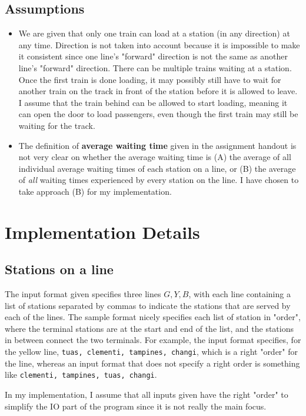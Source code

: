 \documentclass[12pt]{article}
\begin{document}
\subsection{Assumptions}
\begin{itemize}
	\item We are given that only one train can load at a station (in any direction) at any time. Direction is not taken into account because it is impossible to make it consistent since one line's "forward" direction is not the same as another line's "forward" direction. There can be multiple trains waiting at a station. Once the first train is done loading, it may possibly still have to wait for another train on the track in front of the station before it is allowed to leave. I assume that the train behind can be allowed to start loading, meaning it can open the door to load passengers, even though the first train may still be waiting for the track.
	\item The definition of \textbf{average waiting time} given in the assignment handout is not very clear on whether the average waiting time is (A) the average of all individual average waiting times of each station on a line, or (B) the average of \textit{all} waiting times experienced by every station on the line. I have chosen to take approach (B) for my implementation.
\end{itemize}

\section{Implementation Details}

\subsection{Stations on a line}

The input format given specifies three lines $G, Y, B$, with each line containing a list of stations separated by commas to indicate the stations that are served by each of the lines. The sample format nicely specifies each list of station in "order", where the terminal stations are at the start and end of the list, and the stations in between connect the two terminals. For example, the input format specifies, for the yellow line, \verb!tuas, clementi, tampines, changi!, which is a right "order" for the line, whereas an input format that does not specify a right order is something like \verb!clementi, tampines, tuas, changi!.

\bigbreak \noindent In my implementation, I assume that all inputs given have the right "order" to simplify the IO part of the program since it is not really the main focus.
\end{document}
